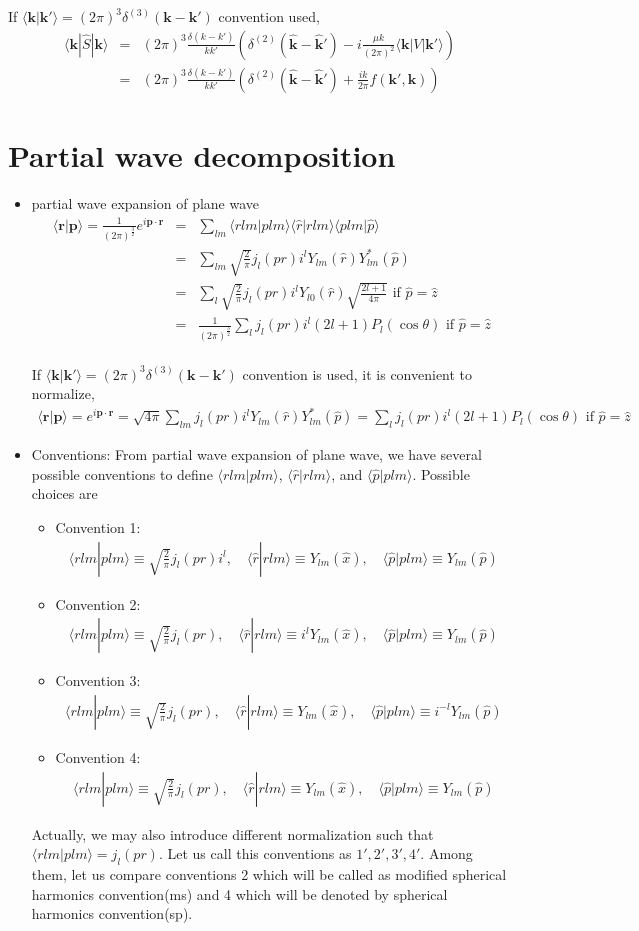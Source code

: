 \documentclass[10pt]{article}
\def\bm{\boldsymbol}
\newcommand{\bea}{\begin{eqnarray}}
\newcommand{\eea}{\end{eqnarray}}
\newcommand{\no}{\nonumber \\}
\def\vp{{\bm p}}
\def\vk{{\bm k}}
\def\vr{{\bm r}}
\def\la{\langle}
\def\ra{\rangle}
\begin{document}
\begin{itemize}
If $\la \vk|\vk'\ra=(2\pi)^3\delta^{(3)}(\vk-\vk')$
convention used,
\bea
\la \vk|\hat{S}|\vk\ra
&=&(2\pi)^3\frac{\delta(k-k')}{k k'}\left(\delta^{(2)}(\hat{\vk}-\hat{\vk}')
   -i \frac{\mu k}{(2\pi)^2}  \la \vk| V|\vk'\ra \right) \no
&=&(2\pi)^3\frac{\delta(k-k')}{k k'}
    \left(\delta^{(2)}(\hat{\vk}-\hat{\vk}')
   +\frac{i k}{2\pi}  f(\vk',\vk)\right)  
\eea
\end{itemize}

\section{Partial wave decomposition}
\begin{itemize}
\item partial wave expansion of plane wave
\bea
\la \vr|\vp\ra=\frac{1}{(2\pi)^{\frac{3}{2}}}e^{i\vp\cdot\vr}
&=& \sum_{lm} \la r lm| p lm\ra \la \hat{r}|r lm\ra 
                                \la p lm |\hat{p}\ra    
\no
&=& \sum_{lm} \sqrt{\frac{2}{\pi}} j_l(pr) i^l Y_{lm}(\hat{r})Y^*_{lm}(\hat{p}) \no
&=& \sum_{l}\sqrt{\frac{2}{\pi}} j_l(pr) i^l Y_{l0}(\hat{r})\sqrt{\frac{2l+1}{4\pi}} 
\mbox{ if $\hat{p}=\hat{z}$}\no
&=& \frac{1}{(2\pi)^{\frac{3}{2}}}
\sum_{l}j_l(pr) i^l(2l+1) P_{l}(\cos\theta) 
\mbox{ if $\hat{p}=\hat{z}$}\no
\eea

If $\la \vk|\vk'\ra=(2\pi)^3\delta^{(3)}(\vk-\vk')$
convention is used, it is convenient to normalize,
\bea
\la \vr|\vp\ra=e^{i\vp\cdot\vr}
=\sqrt{4\pi}\sum_{lm} j_l(pr) i^l Y_{lm}(\hat{r})Y^*_{lm}(\hat{p})
=\sum_l j_l(pr)i^l (2l+1) P_l(\cos\theta)
\mbox{ if } \hat{p}=\hat{z}
\eea

\item Conventions: From partial wave expansion of
plane wave, we have several possible conventions to 
define $\la r lm|plm\ra$, $\la \hat{r}| r lm\ra$,
and $\la \hat{p}|p lm\ra$. Possible choices are

\begin{itemize}
\item Convention 1:
\bea
\la r lm|p lm\ra \equiv\sqrt{\frac{2}{\pi}}j_l(pr) i^l,\quad
\la \hat{r}| r lm\ra \equiv Y_{lm}(\hat{x}),\quad
\la \hat{p}|p lm\ra\equiv Y_{lm}(\hat{p})
\eea
\item Convention 2:
\bea
\la r lm|p lm\ra \equiv\sqrt{\frac{2}{\pi}}j_l(pr),\quad
\la \hat{r}| r lm\ra \equiv i^l Y_{lm}(\hat{x}),\quad
\la \hat{p}|p lm\ra \equiv Y_{lm}(\hat{p})
\eea
\item Convention 3:
\bea
\la r lm|p lm\ra \equiv \sqrt{\frac{2}{\pi}}j_l(pr),\quad
\la \hat{r}| r lm\ra \equiv Y_{lm}(\hat{x}),\quad 
\la \hat{p}|p lm\ra \equiv i^{-l} Y_{lm}(\hat{p})
\eea
\item Convention 4:
\bea
\la r lm|p lm\ra \equiv\sqrt{\frac{2}{\pi}}j_l(pr),\quad
\la \hat{r}| r lm\ra \equiv Y_{lm}(\hat{x}),\quad 
\la \hat{p}|p lm\ra \equiv Y_{lm}(\hat{p})
\eea
\end{itemize}
Actually, we may also introduce different normalization
such that $\la r lm|plm\ra =j_{l}(pr)$. Let us call this 
conventions as $1',2',3',4'$. Among them, let us compare
conventions 2 which will be called as modified spherical 
harmonics convention(ms) and 4 which will be denoted
by spherical harmonics convention(sp).


\end{itemize}
\end{document}
